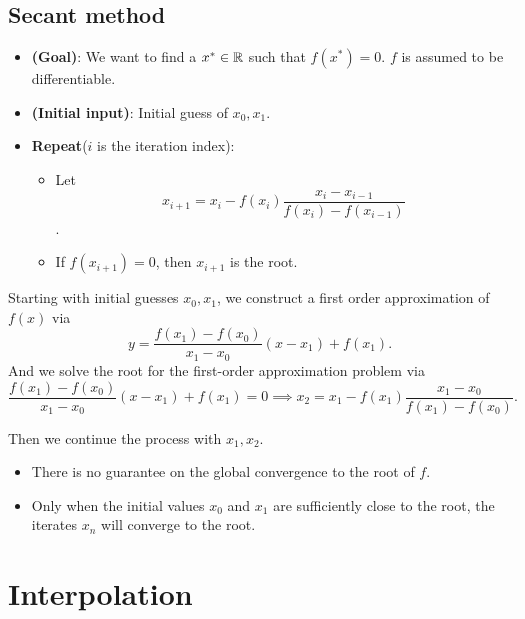 \begin{refsection}
 
 \subsection{Secant method}
 
  \begin{definition}\hfill
 	\begin{itemize}
 		\item \textbf{(Goal)}: We want to find a $x^*\in \mathbb{R}$ such that $f(x^*) = 0$. $f$ is assumed to be differentiable.
 		\item \textbf{(Initial input)}: Initial guess of $x_0, x_1$.
 		\item \textbf{Repeat}($i$ is the iteration index): 
 		\begin{itemize}
 			\item Let $$x_{i+1} = x_i - f(x_i)\frac{x_{i} - x_{i-1}}{f(x_i) - f(x_{i-1})}$$.
 			\item If $f(x_{i+1}) = 0$, then $x_{i+1}$ is the root.
 		\end{itemize}
 	\end{itemize}	
 \end{definition}

\begin{remark}[derivation]
Starting with initial guesses $x_0,x_1$, we construct a first order approximation of $f(x)$ via
$$y = \frac{f(x_1)-f(x_0)}{x_1-x_0}(x-x_1) + f(x_1).$$
And we solve the root for the first-order approximation problem via
$$\frac{f(x_1)-f(x_0)}{x_1-x_0}(x-x_1) + f(x_1) = 0\implies x_{2} = x_1 - f(x_1)\frac{x_{1} - x_{0}}{f(x_1) - f(x_{0})}.$$

Then we continue the process with $x_1,x_2$.
\end{remark}

\begin{remark}\hfill
\begin{itemize}
	\item There is no guarantee on the global convergence to the root of $f$.
	\item Only when the initial values $x_0$ and $x_1$ are sufficiently close to the root, the iterates $x_n$ will converge to the root. 
\end{itemize}		
	
\end{remark}

\section{Interpolation}



\end{refsection}
